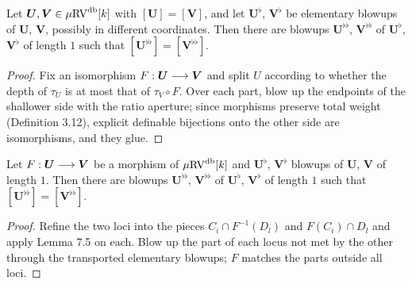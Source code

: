 \setcounter{theorem}{4}
\begin{lemma}
\label{elementary-blowups-preserves-iso-vol}
\leanok
{}
Let $\boldsymbol{U}, \boldsymbol{V} \in \mu\mathrm{RV}^{\operatorname{db}}[k]$ with $[\boldsymbol{U}] = [\boldsymbol{V}]$, and let $\boldsymbol{U}^\flat$, $\boldsymbol{V}^\flat$ be elementary blowups of $\boldsymbol{U}$, $\boldsymbol{V}$, possibly in different coordinates. Then there are blowups $\boldsymbol{U}^{\flat\flat}$, $\boldsymbol{V}^{\flat\flat}$ of $\boldsymbol{U}^\flat$, $\boldsymbol{V}^\flat$ of length $1$ such that $[\boldsymbol{U}^{\flat\flat}] = [\boldsymbol{V}^{\flat\flat}]$.
\end{lemma}

\begin{proof}
\leanok
Fix an isomorphism $F : \boldsymbol{U} \longrightarrow \boldsymbol{V}$ and split $U$ according to whether the depth of $\tau_U$ is at most that of $\tau_V \circ F$. Over each part, blow up the endpoints of the shallower side with the ratio aperture; since morphisms preserve total weight (Definition 3.12), explicit definable bijections onto the other side are isomorphisms, and they glue.
\end{proof}

\setcounter{theorem}{5}
\begin{corollary}
\label{eblowup-same-loci-iso}
\leanok
{}
Let $F : \boldsymbol{U} \longrightarrow \boldsymbol{V}$ be a morphism of $\mu\mathrm{RV}^{\operatorname{db}}[k]$ and $\boldsymbol{U}^\flat$, $\boldsymbol{V}^\flat$ blowups of $\boldsymbol{U}$, $\boldsymbol{V}$ of length $1$. Then there are blowups $\boldsymbol{U}^{\flat\flat}$, $\boldsymbol{V}^{\flat\flat}$ of $\boldsymbol{U}^\flat$, $\boldsymbol{V}^\flat$ of length $1$ such that $[\boldsymbol{U}^{\flat\flat}] = [\boldsymbol{V}^{\flat\flat}]$.
\end{corollary}

\begin{proof}
\leanok
Refine the two loci into the pieces $C_i \cap F^{-1}(D_l)$ and $F(C_i) \cap D_l$ and apply Lemma 7.5 on each. Blow up the part of each locus not met by the other through the transported elementary blowups; $F$ matches the parts outside all loci.
\end{proof}

